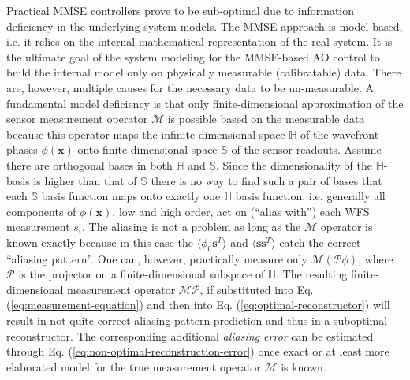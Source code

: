 Practical MMSE controllers prove to be sub-optimal due to
information deficiency in the underlying system models. The MMSE approach
is model-based, i.e. it relies on the internal mathematical representation of
the real system. It is the ultimate goal of the system modeling for the
MMSE-based AO control to build the internal model only on physically measurable
(calibratable) data. There are, however, multiple causes for the necessary
data to be un-measurable. A fundamental model deficiency is that only
finite-dimensional approximation of the sensor measurement operator
$\mathcal{M}$ is possible based on the measurable data because this operator
maps the infinite-dimensional space $\mathbb{H}$ of the wavefront phases
$\phi(\bm{x})$ onto finite-dimensional space $\mathbb{S}$ of the sensor
readouts. Assume there are orthogonal bases in both $\mathbb{H}$ and
$\mathbb{S}$. Since the dimensionality of the $\mathbb{H}$-basis is higher
than that of $\mathbb{S}$ there is no way to find such a pair of bases that
each $\mathbb{S}$ basis function maps onto exactly one $\mathbb{H}$ basis
function, i.e. generally all components of $\phi(\bm{x})$, low and high order,
act on (``alias with'') each WFS measurement $s_{i}$. The aliasing is not a
problem as long as the $\mathcal{M}$ operator is known exactly because in this
case the $\langle \phi_{0} \bm{s}^{T} \rangle$ and $\langle \bm{s} \bm{s}^{T}
\rangle$ catch the correct ``aliasing pattern''. One can, however, practically
measure only $\mathcal{M}(\mathcal{P}\phi)$, where $\mathcal{P}$ is the
projector on a finite-dimensional subspace of $\mathbb{H}$. The resulting
finite-dimensional measurement operator $\mathcal{MP}$, if substituted into
Eq. (\ref{eq:measurement-equation}) and then into Eq.
(\ref{eq:optimal-reconstructor}) will result in not quite correct aliasing
pattern prediction and thus in a suboptimal reconstructor. The corresponding
additional
\emph{aliasing error}  can be estimated through
Eq. (\ref{eq:non-optimal-reconstruction-error}) once exact or at least more
elaborated model for the true measurement operator $\mathcal{M}$ is known.

